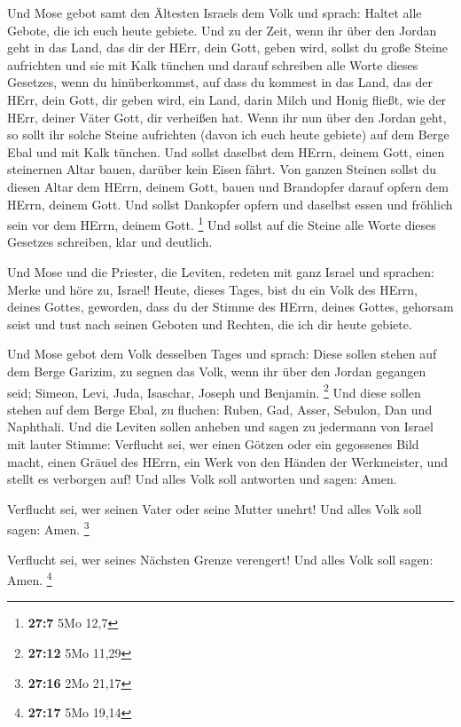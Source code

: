  Und Mose gebot samt den Ältesten Israels dem Volk und
sprach: Haltet alle Gebote, die ich euch heute gebiete.  Und
zu der Zeit, wenn ihr über den Jordan geht in das Land, das dir der
HErr, dein Gott, geben wird, sollst du große Steine aufrichten und sie
mit Kalk tünchen  und darauf schreiben alle Worte dieses
Gesetzes, wenn du hinüberkommst, auf dass du kommest in das Land, das
der HErr, dein Gott, dir geben wird, ein Land, darin Milch und Honig
fließt, wie der HErr, deiner Väter Gott, dir verheißen hat. 
Wenn ihr nun über den Jordan geht, so sollt ihr solche Steine aufrichten
(davon ich euch heute gebiete) auf dem Berge Ebal und mit Kalk tünchen.
 Und sollst daselbst dem HErrn, deinem Gott, einen
steinernen Altar bauen, darüber kein Eisen fährt.  Von
ganzen Steinen sollst du diesen Altar dem HErrn, deinem Gott, bauen und
Brandopfer darauf opfern dem HErrn, deinem Gott.  Und sollst
Dankopfer opfern und daselbst essen und fröhlich sein vor dem HErrn,
deinem Gott. \footnote{\textbf{27:7} 5Mo 12,7}  Und sollst
auf die Steine alle Worte dieses Gesetzes schreiben, klar und deutlich.

 Und Mose und die Priester, die Leviten, redeten mit ganz
Israel und sprachen: Merke und höre zu, Israel! Heute, dieses Tages,
bist du ein Volk des HErrn, deines Gottes, geworden,  dass
du der Stimme des HErrn, deines Gottes, gehorsam seist und tust nach
seinen Geboten und Rechten, die ich dir heute gebiete.

 Und Mose gebot dem Volk desselben Tages und sprach:
 Diese sollen stehen auf dem Berge Garizim, zu segnen das
Volk, wenn ihr über den Jordan gegangen seid; Simeon, Levi, Juda,
Isaschar, Joseph und Benjamin. \footnote{\textbf{27:12} 5Mo 11,29}
 Und diese sollen stehen auf dem Berge Ebal, zu fluchen:
Ruben, Gad, Asser, Sebulon, Dan und Naphthali.  Und die
Leviten sollen anheben und sagen zu jedermann von Israel mit lauter
Stimme:  Verflucht sei, wer einen Götzen oder ein
gegossenes Bild macht, einen Gräuel des HErrn, ein Werk von den Händen
der Werkmeister, und stellt es verborgen auf! Und alles Volk soll
antworten und sagen: Amen.

 Verflucht sei, wer seinen Vater oder seine Mutter unehrt!
Und alles Volk soll sagen: Amen. \footnote{\textbf{27:16} 2Mo 21,17}

 Verflucht sei, wer seines Nächsten Grenze verengert! Und
alles Volk soll sagen: Amen. \footnote{\textbf{27:17} 5Mo 19,14}

